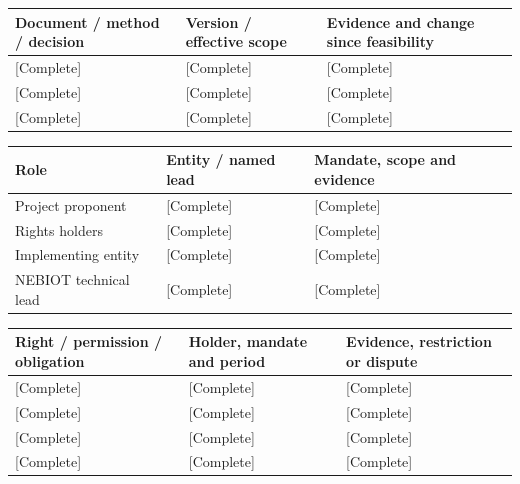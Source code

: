 {\sffamily\fontsize{8.3}{10.3}\selectfont\begin{longtable}{@{}P{56.09mm} P{46.19mm} P{62.69mm}@{}}
\toprule
\textbf{Document / method / decision} & \textbf{Version / effective scope} & \textbf{Evidence and change since feasibility}\\\midrule\endhead
\rule{0pt}{7.7mm}[Complete] & [Complete] & [Complete]\\\hline
\rule{0pt}{7.7mm}[Complete] & [Complete] & [Complete]\\\hline
\rule{0pt}{7.7mm}[Complete] & [Complete] & [Complete]\\\hline
\end{longtable}}
{\sffamily\fontsize{8.3}{10.3}\selectfont\begin{longtable}{@{}P{41.24mm} P{46.19mm} P{77.54mm}@{}}
\toprule
\textbf{Role} & \textbf{Entity / named lead} & \textbf{Mandate, scope and evidence}\\\midrule\endhead
\rule{0pt}{7.7mm}Project proponent & [Complete] & [Complete]\\\hline
\rule{0pt}{7.7mm}Rights holders & [Complete] & [Complete]\\\hline
\rule{0pt}{7.7mm}Implementing entity & [Complete] & [Complete]\\\hline
\rule{0pt}{7.7mm}NEBIOT technical lead & [Complete] & [Complete]\\\hline
\end{longtable}}
{\sffamily\fontsize{8.3}{10.3}\selectfont\begin{longtable}{@{}P{52.79mm} P{56.09mm} P{56.09mm}@{}}
\toprule
\textbf{Right / permission / obligation} & \textbf{Holder, mandate and period} & \textbf{Evidence, restriction or dispute}\\\midrule\endhead
\rule{0pt}{7.7mm}[Complete] & [Complete] & [Complete]\\\hline
\rule{0pt}{7.7mm}[Complete] & [Complete] & [Complete]\\\hline
\rule{0pt}{7.7mm}[Complete] & [Complete] & [Complete]\\\hline
\rule{0pt}{7.7mm}[Complete] & [Complete] & [Complete]\\\hline
\end{longtable}}
